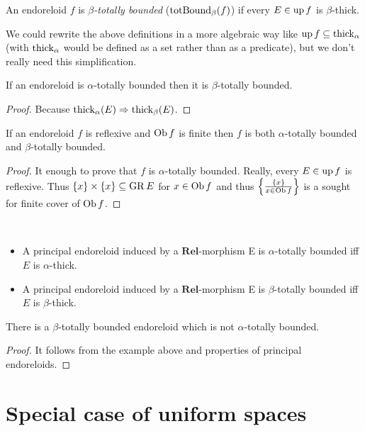 \begin{defn}
An endoreloid $f$ is \emph{$\beta$-totally bounded} ($\operatorname{totBound}_{\beta}(f)$)
if every $E\in\operatorname{up} f$ is $\beta$-thick.\end{defn}
\begin{rem}
We could rewrite the above definitions in a more algebraic way like
$\operatorname{up} f\subseteq\operatorname{thick}_{\alpha}$ (with $\operatorname{thick}_{\alpha}$ would be
defined as a set rather than as a predicate), but we don't really
need this simplification.\end{rem}
\begin{prop}
If an endoreloid is $\alpha$-totally bounded then it is $\beta$-totally
bounded.\end{prop}
\begin{proof}
Because $\operatorname{thick}_{\alpha}(E)\Rightarrow\operatorname{thick}_{\beta}(E)$.\end{proof}
\begin{prop}
If an endoreloid $f$ is reflexive and $\operatorname{Ob} f$ is finite then $f$
is both $\alpha$-totally bounded and $\beta$-totally bounded.\end{prop}
\begin{proof}
It enough to prove that $f$ is $\alpha$-totally bounded. Really,
every $E\in\operatorname{up} f$ is reflexive. Thus $\{x\}\times\{x\}\subseteq\operatorname{GR} E$
for $x\in\operatorname{Ob} f$ and thus $\left\{ \frac{\{x\}}{x\in\operatorname{Ob} f}\right\}$ is a sought
for finite cover of $\operatorname{Ob} f$.\end{proof}
\begin{obvious}
~
\begin{itemize}
\item A principal endoreloid induced by a $\mathbf{Rel}$-morphism E is
$\alpha$-totally bounded iff $E$ is $\alpha$-thick.
\item A principal endoreloid induced by a $\mathbf{Rel}$-morphism E is
$\beta$-totally bounded iff $E$ is $\beta$-thick.
\end{itemize}
\end{obvious}
\begin{example}
There is a $\beta$-totally bounded endoreloid which is not $\alpha$-totally
bounded.\end{example}
\begin{proof}
It follows from the example above and properties of principal endoreloids.
\end{proof}

\section{Special case of uniform spaces}

